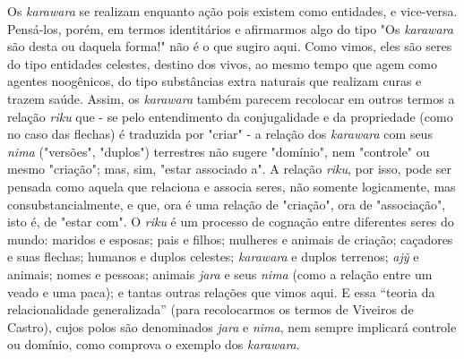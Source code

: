 Os \emph{karawara} se realizam enquanto ação pois existem como
entidades, e vice-versa. Pensá-los, porém, em termos identitários e
afirmarmos algo do tipo "Os \emph{karawara} são desta ou daquela forma!"
não é o que sugiro aqui. Como vimos, eles são seres do tipo entidades
celestes, destino dos vivos, ao mesmo tempo que agem como agentes
noogênicos, do tipo substâncias extra naturais que realizam curas e
trazem saúde. Assim, os \emph{karawara} também parecem recolocar em
outros termos a relação \emph{riku} que - se pelo entendimento da
conjugalidade e da propriedade (como no caso das flechas) é traduzida
por "criar" - a relação dos \emph{karawara} com seus \emph{nima}
("versões", "duplos") terrestres não sugere "domínio", nem "controle" ou
mesmo "criação"; mas, sim, "estar associado a". A relação \emph{riku},
por isso, pode ser pensada como aquela que relaciona e associa seres,
não somente logicamente, mas consubstancialmente, e que, ora é uma
relação de "criação", ora de "associação", isto é, de "estar com". O
\emph{riku} é um processo de cognação entre diferentes seres do mundo:
maridos e esposas; pais e filhos; mulheres e animais de criação;
caçadores e suas flechas; humanos e duplos celestes; \emph{karawara} e
duplos terrenos; \emph{ajỹ} e animais; nomes e pessoas; animais
\emph{jara} e seus \emph{nima} (como a relação entre um veado e uma
paca); e tantas outras relações que vimos aqui. E essa ``teoria da
relacionalidade generalizada'' (para recolocarmos os termos de Viveiros
de Castro), cujos polos são denominados \emph{jara} e \emph{nima}, nem
sempre implicará controle ou domínio, como comprova o exemplo dos
\emph{karawara}.

